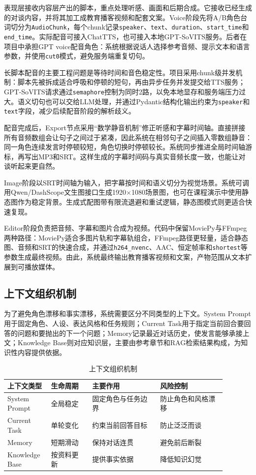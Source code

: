 \documentclass{rjthesis}
\begin{document}
表现层接收内容层产出的脚本，重点处理听感、画面和后期合成。它接收已经生成的对谈内容，并将其加工成教育播客视频和配套文案。Voice阶段先将A/B角色台词切分为\texttt{AudioChunk}，每个chunk记录\texttt{speaker}、\texttt{text}、\texttt{duration}、\texttt{start\_time}和\texttt{end\_time}。实际配音可接入ChatTTS，也可接入本地GPT-SoVITS服务。后者在项目中承担GPT voice配音角色：系统根据说话人选择参考音频、提示文本和语言参数，并使用\texttt{cut0}模式，避免服务端重复切句。

长脚本配音的主要工程问题是等待时间和音色稳定性。项目采用chunk级并发机制：脚本先被拆成适合呼吸和停顿的短句，再由异步任务并发提交给TTS服务；GPT-SoVITS请求通过\texttt{semaphore}控制为同时2路，以免本地显存和服务端压力过大。语义切句也可以交给LLM处理，并通过Pydantic结构化输出约束为\texttt{speaker}和\texttt{text}字段，减少后续配音阶段的解析歧义。

配音完成后，Export节点采用“数学静音机制”修正听感和字幕时间轴。直接拼接所有音频数组会让句子之间过于紧凑，因此系统在相邻句子之间插入零数组静音：同一角色连续发言时停顿较短，角色切换时停顿较长。系统同步推进全局时间轴游标，再写出MP3和SRT。这样生成的字幕时间码与真实音频长度一致，也能让对谈听起来更自然。

Image阶段以SRT时间轴为输入，把字幕按时间和语义切分为视觉场景。系统可调用Qwen/DashScope文生图接口生成1920$\times$1080场景图，也可在课程演示中使用静态图作为稳定背景。生成式配图带有限流退避和重试逻辑，静态图模式则更适合快速复现。

Editor阶段负责把音频、字幕和图片合成为视频。代码中保留MoviePy与FFmpeg两种路径：MoviePy适合多图片轨和字幕轨组合，FFmpeg路径更轻量，适合静态图、音频和SRT的快速合成，并通过\texttt{h264\_nvenc}、AAC、恒定帧率和\texttt{shortest}等参数生成最终视频。由此，系统最终输出教育播客视频和文案，产物范围从文本扩展到可播放媒体。

\subsection{上下文组织机制}

为了避免角色漂移和事实漂移，系统需要区分不同类型的上下文。System Prompt用于固定角色、人设、表达风格和任务规则；Current Task用于指定当前回合要回答的问题和要抛出的下一个问题；Memory记录最近对话历史，使发言能够承接上文；Knowledge Base则对应知识层，主要由参考章节和RAG检索结果构成，为知识性内容提供依据。

\begin{table}[htbp]
\centering
\caption{上下文组织机制}
\begin{tabular}{p{0.16\linewidth}p{0.17\linewidth}p{0.28\linewidth}p{0.27\linewidth}}
\toprule
上下文类型 & 生命周期 & 主要作用 & 风险控制\\
\midrule
System Prompt & 全局稳定 & 固定角色与任务边界 & 防止角色和风格漂移\\
Current Task & 单轮变化 & 约束当前回答目标 & 防止泛泛而谈\\
Memory & 短期滑动 & 保持对话连贯 & 避免前后断裂\\
Knowledge Base & 按资料更新 & 提供事实依据 & 降低知识幻觉\\
\bottomrule
\end{tabular}
\end{table}
\end{document}
